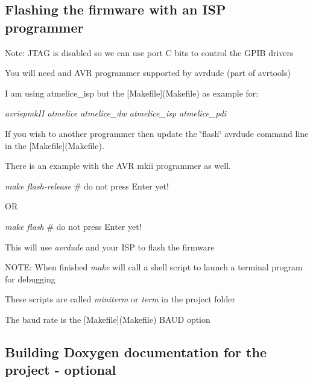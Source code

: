 \subsection*{Flashing the firmware with an I\+SP programmer}


\begin{DoxyItemize}
\item Note\+: J\+T\+AG is disabled so we can use port C bits to control the G\+P\+IB drivers
\item You will need and A\+VR programmer supported by avrdude (part of avrtools)
\begin{DoxyItemize}
\item I am using atmelice\+\_\+isp but the \mbox{[}Makefile\mbox{]}(Makefile) as example for\+:
\item {\itshape avrispmk\+II atmelice atmelice\+\_\+dw atmelice\+\_\+isp atmelice\+\_\+pdi}
\item If you wish to another programmer then update the \char`\"{}flash\char`\"{} avrdude command line in the \mbox{[}Makefile\mbox{]}(Makefile).
\item There is an example with the A\+VR mkii programmer as well.
\end{DoxyItemize}
\item {\itshape make flash-\/release} \# do not press Enter yet!
\begin{DoxyItemize}
\item OR
\end{DoxyItemize}
\item {\itshape make flash} \# do not press Enter yet!
\begin{DoxyItemize}
\item This will use {\itshape avrdude} and your I\+SP to flash the firmware
\item N\+O\+TE\+: When finished {\itshape make} will call a shell script to launch a terminal program for debugging
\begin{DoxyItemize}
\item These scripts are called {\itshape miniterm} or {\itshape term} in the project folder
\begin{DoxyItemize}
\item The baud rate is the \mbox{[}Makefile\mbox{]}(Makefile) B\+A\+UD option
\end{DoxyItemize}
\end{DoxyItemize}
\end{DoxyItemize}
\end{DoxyItemize}

\subsection*{Building Doxygen documentation for the project -\/ optional}


